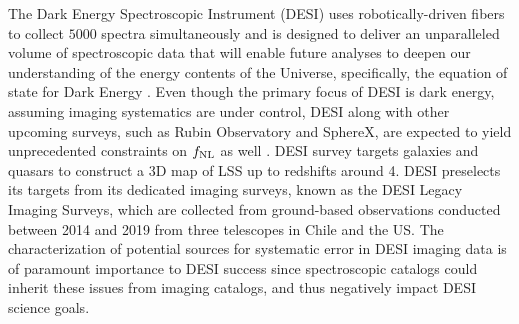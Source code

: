 The Dark Energy Spectroscopic Instrument (DESI) uses robotically-driven fibers to collect $5000$ spectra simultaneously and is designed to deliver an unparalleled volume of spectroscopic data that will enable future analyses to deepen our understanding of the energy contents of the Universe, specifically, the equation of state for Dark Energy \citep{aghamousa2016desi}. Even though the primary focus of DESI is dark energy, assuming imaging systematics are under control, DESI along with other upcoming surveys, such as Rubin Observatory and SphereX, are expected to yield unprecedented constraints on $f_{\rm NL}$ as well \citep[see, e.g.,][]{Heinrich2022AAS...24020203H}. DESI survey targets galaxies and quasars to construct a 3D map of LSS up to redshifts around 4. DESI preselects its targets from its dedicated imaging surveys, known as the DESI Legacy Imaging Surveys, which are collected from ground-based observations conducted between 2014 and 2019 from three telescopes in Chile and the US. The characterization of potential sources for systematic error in DESI imaging data is of paramount importance to DESI success since spectroscopic catalogs could inherit these issues from imaging catalogs, and thus negatively impact DESI science goals. 

